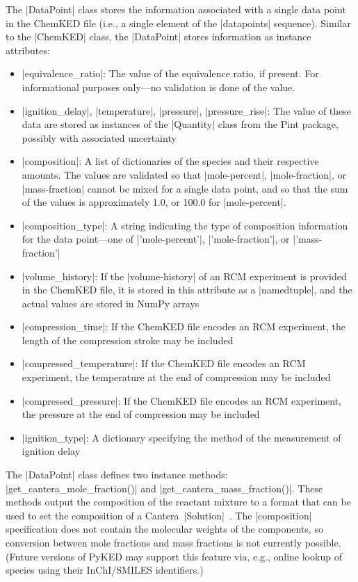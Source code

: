 \documentclass[12pt]{ijck}
\newcommand\ck{ChemKED}
\newcommand\pk{PyKED}
\begin{document}
The \pybox|DataPoint| class stores the information associated with a single data
point in the \ck{} file (i.e., a single element of the \yabox|datapoints|
sequence). Similar to the \pybox|ChemKED| class,
the \pybox|DataPoint| stores information as instance attributes:
%
\begin{itemize}
    \item \pybox|equivalence_ratio|: The value of the equivalence ratio, if
    present. For informational purposes only---no validation is done of the
    value.
    \item \pybox|ignition_delay|, \pybox|temperature|, \pybox|pressure|,
    \pybox|pressure_rise|: The value of these data are stored as instances of
    the \pybox|Quantity| class from the Pint \autocite{Grecco2016} package,
    possibly with associated uncertainty
    \item \pybox|composition|: A list of dictionaries of the species and their
    respective amounts. The values are validated so that \yabox|mole-percent|,
    \yabox|mole-fraction|, or \yabox|mass-fraction| cannot be mixed for a single
    data point, and so that the sum of the values is approximately 1.0, or
    100.0 for \yabox|mole-percent|.
    \item \pybox|composition_type|: A string indicating the type of composition
    information for the data point---one of \pybox|'mole-percent'|,
    \pybox|'mole-fraction'|, or \pybox|'mass-fraction'|
    \item \pybox|volume_history|: If the \yabox|volume-history| of an RCM
    experiment is provided in the \ck{} file, it is stored in this attribute as
    a \pybox|namedtuple|, and the actual values are stored in NumPy arrays
    \autocite{vanderWalt:2011np}
    \item \pybox|compression_time|: If the \ck{} file encodes an RCM experiment,
    the length of the compression stroke may be included
    \item \pybox|compressed_temperature|: If the \ck{} file encodes an RCM experiment,
    the temperature at the end of compression may be included
    \item \pybox|compressed_pressure|: If the \ck{} file encodes an RCM experiment,
    the pressure at the end of compression may be included
    \item \pybox|ignition_type|: A dictionary specifying the method of the
    measurement of ignition delay
\end{itemize}

The \pybox|DataPoint| class defines two instance methods:
\pybox|get_cantera_mole_fraction()| and \pybox|get_cantera_mass_fraction()|.
These methods output the composition of the reactant mixture to a
format that can be used to set the composition of a
Cantera~\pybox|Solution|~\autocite{Cantera:2.3.0}.
The \pybox|composition| specification does not contain the molecular
weights of the components, so conversion between mole fractions and mass
fractions is not currently possible. (Future versions of \pk{} may support this
feature via, e.g., online lookup of species using their InChI\slash SMILES
identifiers.)
\end{document}

